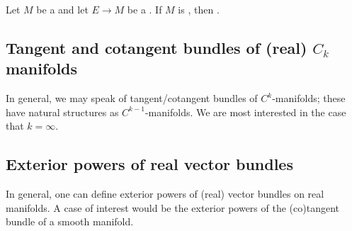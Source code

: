 







\begin{lemma}
    Let $M$ be a  and let $E \to M$ be a . 
    If $M$ is , then . 
\end{lemma}

\subsection{Tangent and cotangent bundles of (real) \texorpdfstring{$C_k$}{Ck} manifolds}

In general, we may speak of tangent/cotangent bundles of $C^k$-manifolds; these have natural structures as $C^{k-1}$-manifolds. We are most interested in the case that $k = \infty$.







\subsection{Exterior powers of real vector bundles}

In general, one can define exterior powers of (real) vector bundles on real manifolds. A case of interest would be the exterior powers of the (co)tangent bundle of a smooth manifold.







